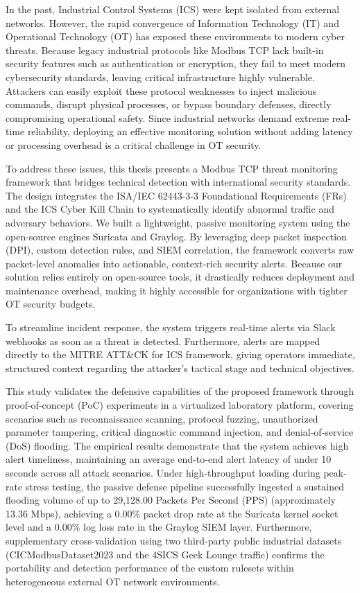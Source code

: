 In the past, Industrial Control Systems (ICS) were kept isolated from external networks. However, the rapid convergence of Information Technology (IT) and Operational Technology (OT) has exposed these environments to modern cyber threats. Because legacy industrial protocols like Modbus TCP lack built-in security features such as authentication or encryption, they fail to meet modern cybersecurity standards, leaving critical infrastructure highly vulnerable. Attackers can easily exploit these protocol weaknesses to inject malicious commands, disrupt physical processes, or bypass boundary defenses, directly compromising operational safety. Since industrial networks demand extreme real-time reliability, deploying an effective monitoring solution without adding latency or processing overhead is a critical challenge in OT security.

To address these issues, this thesis presents a Modbus TCP threat monitoring framework that bridges technical detection with international security standards. The design integrates the ISA/IEC 62443-3-3 Foundational Requirements (FRs) and the ICS Cyber Kill Chain to systematically identify abnormal traffic and adversary behaviors. We built a lightweight, passive monitoring system using the open-source engines Suricata and Graylog. By leveraging deep packet inspection (DPI), custom detection rules, and SIEM correlation, the framework converts raw packet-level anomalies into actionable, context-rich security alerts. Because our solution relies entirely on open-source tools, it drastically reduces deployment and maintenance overhead, making it highly accessible for organizations with tighter OT security budgets.

To streamline incident response, the system triggers real-time alerts via Slack webhooks as soon as a threat is detected. Furthermore, alerts are mapped directly to the MITRE ATT\&CK for ICS framework, giving operators immediate, structured context regarding the attacker’s tactical stage and technical objectives.

This study validates the defensive capabilities of the proposed framework through proof-of-concept (PoC) experiments in a virtualized laboratory platform, covering scenarios such as reconnaissance scanning, protocol fuzzing, unauthorized parameter tampering, critical diagnostic command injection, and denial-of-service (DoS) flooding. The empirical results demonstrate that the system achieves high alert timeliness, maintaining an average end-to-end alert latency of under 10 seconds across all attack scenarios. Under high-throughput loading during peak-rate stress testing, the passive defense pipeline successfully ingested a sustained flooding volume of up to 29,128.00 Packets Per Second (PPS) (approximately 13.36 Mbps), achieving a 0.00\% packet drop rate at the Suricata kernel socket level and a 0.00\% log loss rate in the Graylog SIEM layer. Furthermore, supplementary cross-validation using two third-party public industrial datasets (CICModbusDataset2023 and the 4SICS Geek Lounge traffic) confirms the portability and detection performance of the custom rulesets within heterogeneous external OT network environments.

